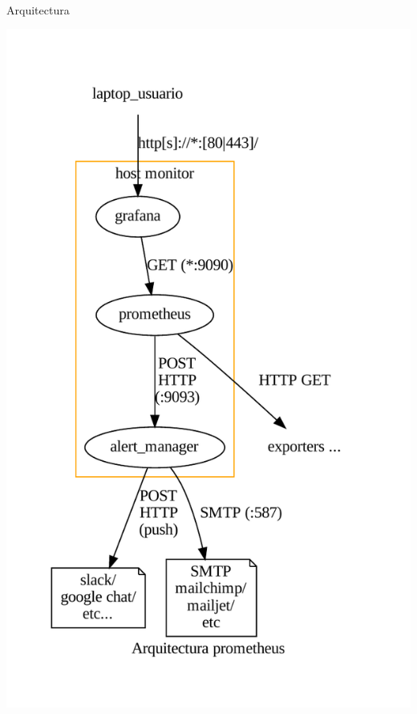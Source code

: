 \documentclass[11pt,spanish]{article}
\newcommand{\rowsp}[1][1em]{\vspace{#1}}
\newcommand{\hone}[1]{{\rowsp[0.3em]\noindent\Large #1 \rowsp[0.3em]}}
\newcommand{\displaypage}[1]{%
\
\vspace{\stretch{1}}
\begin{center}
\hone{#1}
\end{center}
\vspace{\stretch{1}}
}
\newcommand{\myitm}[1]{\begin{itemize}#1\end{itemize}}
\begin{document}
%
%
%
%

\newpage %
\displaypage{Arquitectura}

\newpage %
\begin{center}
	\includegraphics[keepaspectratio=true,width=\textwidth,height=\textheight]{img/prometheus_loki/arq-prometheus}
\end{center}
\end{document}
